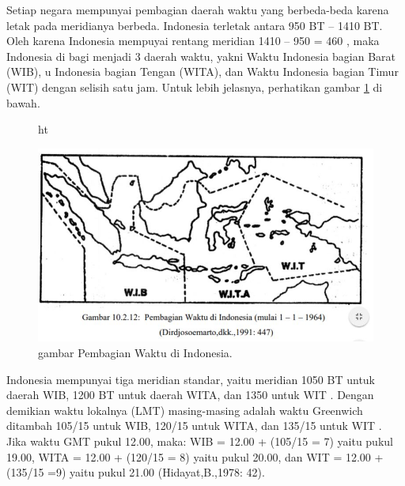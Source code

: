  
Setiap negara mempunyai pembagian daerah waktu yang berbeda-beda karena letak pada meridianya berbeda. 
 Indonesia terletak antara 950 BT – 1410 BT. Oleh karena Indonesia mempuyai rentang meridian 1410 – 950 = 460 , 
 maka Indonesia di bagi menjadi 3 daerah waktu, yakni Waktu Indonesia bagian Barat (WIB),
 u Indonesia bagian Tengan (WITA), dan Waktu Indonesia bagian Timur (WIT) dengan selisih
 satu jam. Untuk lebih jelasnya,  perhatikan gambar \ref{sejarahwaktu_Capture2} di bawah.
 
 \begin{figure}{ht}
 \centerline{\includegraphics[width=1\textwidth]{figures/sejarahwaktu_Capture2.JPG}}
 \caption{gambar Pembagian Waktu di Indonesia.}
 \label{sejarahwaktu_Capture2}
 \end{figure}
 

Indonesia mempunyai tiga meridian standar, yaitu meridian 1050 BT untuk daerah WIB, 
 1200 BT untuk daerah WITA, dan 1350 untuk WIT .  Dengan demikian waktu lokalnya (LMT) 
 masing-masing adalah waktu Greenwich 
 ditambah 105/15 untuk WIB, 120/15 untuk WITA, dan 135/15 untuk WIT .
 Jika waktu GMT pukul 12.00, maka: WIB = 12.00 + (105/15 = 7) yaitu pukul 19.00,
 WITA = 12.00 + (120/15 = 8) yaitu pukul 20.00, 
 dan WIT = 12.00 + (135/15 =9) yaitu pukul 21.00 (Hidayat,B.,1978: 42).
 
